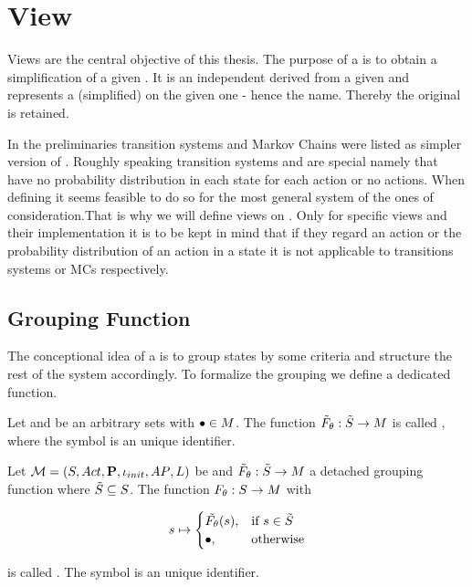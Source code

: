 \documentclass[preview]{standalone}
\begin{document}
	
\section{View}
Views are the central objective of this thesis. The purpose of a \viewN is to obtain a simplification of a given \chgphN.  It is an independent \chgphN derived from a given \chgphN and represents a (simplified) \viewN on the given one - hence the name. Thereby the original \chgphN is retained.

In the preliminaries transition systems and Markov Chains were listed as simpler version of \mdpsN. Roughly speaking transition systems and \mdpsN are special \mdpsN namely that have no probability distribution in each state for each action or no actions. When defining \viewsN it seems feasible to do so for the most general system of the ones of consideration.That is why we will define views on \mdpsN. Only for specific views and their implementation it is to be kept in mind that if they regard an action or the probability distribution of an action in a state it is not applicable to transitions systems or MCs respectively. 

\subsection{Grouping Function}
The conceptional idea of a \viewN is to group states by some criteria and structure the rest of the system accordingly. To formalize the grouping we define a dedicated function.

\begin{definition}
	Let \smstates and \arbset be an arbitrary sets with ${\bullet} \in {M}$. The function ${\tilde{F}_{{\theta}}} : {\tilde{{S}}} \to {\ensuremath{{M}}}$ is called \emph{\grpfctsubN}, where the symbol \viewppty is an unique identifier.
	
	\label{def:grpfctsub}
\end{definition}


\begin{definition}
	Let ${{{\mathcal{M}}}} = {{({S}, {Act}, {\textbf{P}}, {\iota_{init}}, {AP}, {L})}}$ be \achgphN and ${\tilde{F}_{{\theta}}} : {\tilde{{S}}} \to {\ensuremath{{M}}}$ a detached grouping function where ${\tilde{{S}}} \subseteq {S}$. The function ${F_{{\theta}}} : {S} \to {\ensuremath{{M}}}$ with	
	
	\[
	\state \mapsto
	\begin{cases}
		\tilde\grpfct(s),				& \text{if } \state \in \smstates \\ 		\remelem,          	& \text{otherwise}
	\end{cases}
	\]
	
	is called \emph{\grpfctN}. The symbol \viewppty is an unique identifier.
	
	\label{def:grpfct}
\end{definition}
\end{document}
